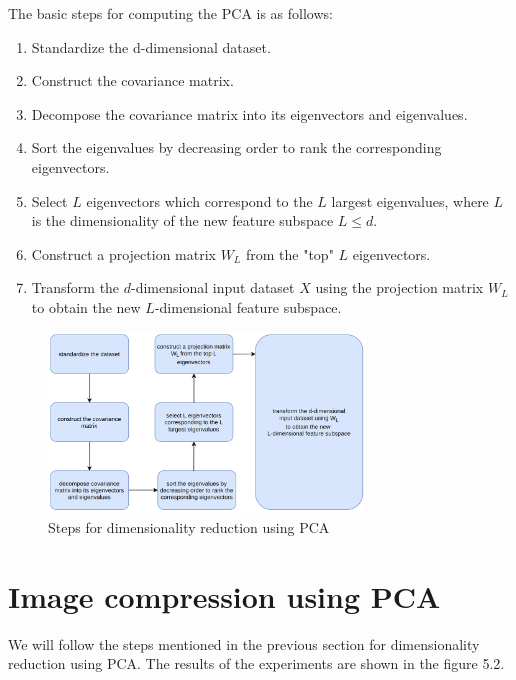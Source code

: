The basic steps for computing the PCA is as follows:

\begin{enumerate}
    \item Standardize the d-dimensional dataset.
    \item Construct the covariance matrix.
    \item Decompose the covariance matrix into its eigenvectors and eigenvalues.
    \item Sort the eigenvalues by decreasing order to rank the corresponding eigenvectors.
    \item Select $L$ eigenvectors which correspond to the $L$ largest eigenvalues, where $L$ is the dimensionality of the new feature subspace $L \leq d$.
    \item Construct a projection matrix $W_L$ from the "top" $L$ eigenvectors.
    \item Transform the $d$-dimensional input dataset $X$ using the projection matrix $W_L$ to obtain the new $L$-dimensional feature subspace.
\end{enumerate}

\vspace{1em}

\begin{figure}[!ht]
    \label{fig:dimensionalityReductionSteps}
    \centering
    \includegraphics[width=0.75\textwidth]{../fig/midsemwork/dimensionalityReductionUsingPCA.png}
    \caption{Steps for dimensionality reduction using PCA}
\end{figure}


\section{Image compression using PCA}


We will follow the steps mentioned in the previous section for dimensionality reduction using PCA. The results of the experiments are shown in the figure 5.2.

